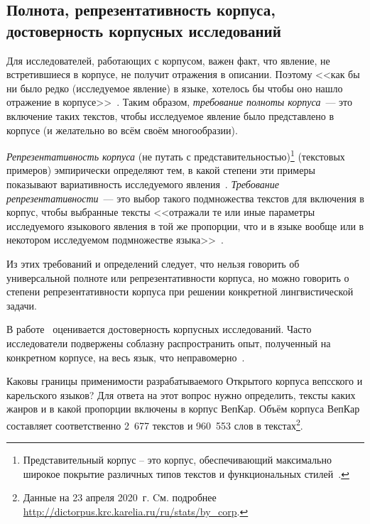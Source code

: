 
\subsection{Полнота, репрезентативность корпуса, достоверность корпусных исследований} \label{sect_corpus_representativeness}

Для исследователей, работающих с корпусом, важен факт, что 
явление, не встретившиеся в корпусе, не получит отражения в описании. 
Поэтому 
<<как бы ни было редко (исследуемое явление) в языке, 
хотелось бы чтобы оно нашло отражение в корпусе>>~\cite[с.~413]{Kibrik2019}. 
Таким образом, \emph{требование полноты корпуса}~--- это включение таких текстов, 
чтобы исследуемое явление было представлено в корпусе 
(и желательно во всём своём многообразии).


\emph{Репрезентативность корпуса} 
(не путать с представительностью)\footnote{Представительный корпус -- 
это корпус, обеспечивающий максимально широкое покрытие  
различных типов текстов и функциональных стилей~\cite{Sharov2004}.
} 
(текстовых примеров) 
эмпирически определяют тем, в какой степени эти примеры показывают 
вариативность исследуемого явления~\cite{Biber1993representativeness}. 
%
\emph{Требование репрезентативности}~--- это выбор такого подмножества текстов 
для включения в корпус, 
чтобы выбранные тексты 
<<отражали те или иные параметры исследуемого языкового явления в той же пропорции, 
что и в языке вообще или в некотором исследуемом подмножестве языка>>~\cite[с.~413]{Kibrik2019}.

Из этих требований и определений следует, что 
нельзя говорить об универсальной полноте или репрезентативности корпуса, 
но можно говорить 
о степени репрезентативности корпуса при решении конкретной лингвистической задачи.




В работе~\cite{Belikov2013}
оценивается достоверность корпусных исследований. 
Часто исследователи подвержены соблазну распространить опыт, полученный на конкретном корпусе, 
на весь язык, что неправомерно~\cite{Belikov2013}.

Каковы границы применимости разрабатываемого Открытого корпуса вепсского и карельского языков? 
Для ответа на этот вопрос нужно определить, тексты каких жанров и в какой пропорции включены в корпус ВепКар. 
Объём корпуса ВепКар составляет соответственно 2~677 текстов и 960~553 слов в текстах\footnote{ Данные на 23 апреля 2020~г. Cм. подробнее 
\href{http://dictorpus.krc.karelia.ru/ru/stats/by\_corp}{http://dictorpus.krc.karelia.ru/ru/stats/by\_corp}.}.

